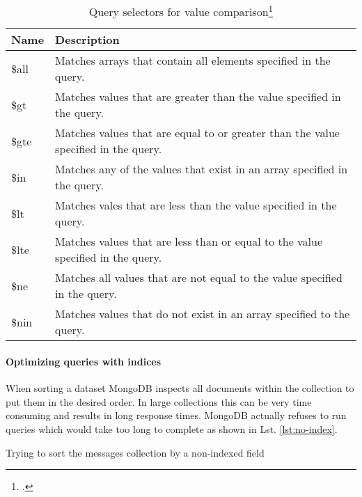 \begin{savenotes}
\begin{table}[htbp]
\begin{tabular*}{\textwidth}{p{} p{}}
\toprule
\textbf{Name} 					& \textbf{Description}\\
\midrule 
\$all    & Matches arrays that contain all elements specified in the query. \\
\$gt     & Matches values that are greater than the value specified in the query.\\
\$gte    & Matches values that are equal to or greater than the value specified in the query.\\
\$in     & Matches any of the values that exist in an array specified in the query.\\
\$lt     & Matches vales that are less than the value specified in the query.\\
\$lte    & Matches values that are less than or equal to the value specified in the query.\\
\$ne     & Matches all values that are not equal to the value specified in the query.\\
\$nin    & Matches values that do not exist in an array specified to the query.\\
\bottomrule 
\end{tabular*}
  \caption[Query selectors for value comparison]{Query selectors for value comparison\footcite[][]{mongo_query_ops}}
  \label{tab:query-selectors-compare}
\end{table}
\end{savenotes}


\paragraph{Optimizing queries with indices}
When sorting a dataset MongoDB inspects all documents within the collection
to put them in the desired order. In large collections this can be very time
consuming and results in long response times.
MongoDB actually refuses to run queries which would take too long to complete as shown in
Lst. \ref{lst:no-index}.

\begin{listing}
    \caption{Trying to sort the messages collection by a non-indexed field}
    \label{lst:no-index}
\end{listing}

